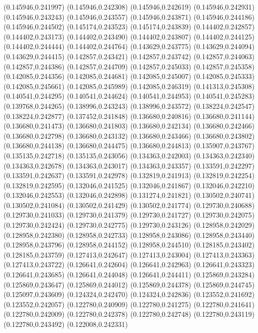(0.145946,0.241997)
(0.145946,0.242308)
(0.145946,0.242619)
(0.145946,0.242931)
(0.145946,0.243243)
(0.145946,0.243557)
(0.145946,0.243871)
(0.145946,0.244186)
(0.145946,0.244502)
(0.145174,0.243523)
(0.145174,0.243839)
(0.144402,0.242857)
(0.144402,0.243173)
(0.144402,0.243490)
(0.144402,0.243807)
(0.144402,0.244125)
(0.144402,0.244444)
(0.144402,0.244764)
(0.143629,0.243775)
(0.143629,0.244094)
(0.143629,0.244415)
(0.142857,0.243421)
(0.142857,0.243742)
(0.142857,0.244063)
(0.142857,0.244386)
(0.142857,0.244709)
(0.142857,0.245033)
(0.142857,0.245358)
(0.142085,0.244356)
(0.142085,0.244681)
(0.142085,0.245007)
(0.142085,0.245333)
(0.142085,0.245661)
(0.142085,0.245989)
(0.142085,0.246319)
(0.141313,0.245308)
(0.140541,0.244295)
(0.140541,0.244624)
(0.140541,0.244953)
(0.140541,0.245283)
(0.139768,0.244265)
(0.138996,0.243243)
(0.138996,0.243572)
(0.138224,0.242547)
(0.138224,0.242877)
(0.137452,0.241848)
(0.136680,0.240816)
(0.136680,0.241144)
(0.136680,0.241473)
(0.136680,0.241803)
(0.136680,0.242134)
(0.136680,0.242466)
(0.136680,0.242798)
(0.136680,0.243132)
(0.136680,0.243466)
(0.136680,0.243802)
(0.136680,0.244138)
(0.136680,0.244475)
(0.136680,0.244813)
(0.135907,0.243767)
(0.135135,0.242718)
(0.135135,0.243056)
(0.134363,0.242003)
(0.134363,0.242340)
(0.134363,0.242678)
(0.134363,0.243017)
(0.134363,0.243357)
(0.133591,0.242297)
(0.133591,0.242637)
(0.133591,0.242978)
(0.132819,0.241913)
(0.132819,0.242254)
(0.132819,0.242595)
(0.132046,0.241525)
(0.132046,0.241867)
(0.132046,0.242210)
(0.132046,0.242553)
(0.132046,0.242898)
(0.131274,0.241821)
(0.130502,0.240741)
(0.130502,0.241084)
(0.130502,0.241429)
(0.130502,0.241774)
(0.129730,0.240688)
(0.129730,0.241033)
(0.129730,0.241379)
(0.129730,0.241727)
(0.129730,0.242075)
(0.129730,0.242424)
(0.129730,0.242775)
(0.129730,0.243126)
(0.128958,0.242029)
(0.128958,0.242380)
(0.128958,0.242733)
(0.128958,0.243086)
(0.128958,0.243440)
(0.128958,0.243796)
(0.128958,0.244152)
(0.128958,0.244510)
(0.128185,0.243402)
(0.128185,0.243759)
(0.127413,0.242647)
(0.127413,0.243004)
(0.127413,0.243363)
(0.127413,0.243722)
(0.126641,0.242604)
(0.126641,0.242963)
(0.126641,0.243323)
(0.126641,0.243685)
(0.126641,0.244048)
(0.126641,0.244411)
(0.125869,0.243284)
(0.125869,0.243647)
(0.125869,0.244012)
(0.125869,0.244378)
(0.125869,0.244745)
(0.125097,0.243609)
(0.124324,0.242470)
(0.124324,0.242836)
(0.123552,0.241692)
(0.123552,0.242057)
(0.122780,0.240909)
(0.122780,0.241275)
(0.122780,0.241641)
(0.122780,0.242009)
(0.122780,0.242378)
(0.122780,0.242748)
(0.122780,0.243119)
(0.122780,0.243492)
(0.122008,0.242331)
